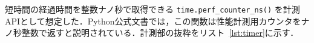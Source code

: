 短時間の経過時間を整数ナノ秒で取得できる \texttt{time.perf\_counter\_ns()} を計測APIとして想定した．Python公式文書では，この関数は性能計測用カウンタをナノ秒整数で返すと説明されている．計測部の抜粋をリスト~\ref{lst:timer}に示す．
